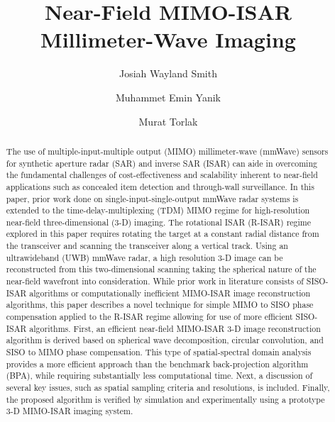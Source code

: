 \documentclass[conference]{IEEEtran}
\begin{document}
	
	\title{Near-Field MIMO-ISAR Millimeter-Wave Imaging}
	
	\author[1]{Josiah Wayland Smith}
	\author[2]{Muhammet Emin Yanik}
	\author[1]{Murat Torlak}
	
	\maketitle
	
	\begin{abstract}
		
		The use of multiple-input-multiple output (MIMO) millimeter-wave (mmWave) sensors for synthetic aperture radar (SAR) and inverse SAR (ISAR) can aide in overcoming the fundamental challenges of cost-effectiveness and scalability inherent to near-field applications such as concealed item detection and through-wall surveillance. In this paper, prior work done on single-input-single-output mmWave radar systems is extended to the time-delay-multiplexing (TDM) MIMO regime for high-resolution near-field three-dimensional (3-D) imaging. The rotational ISAR (R-ISAR) regime explored in this paper requires rotating the target at a constant radial distance from the transceiver and scanning the transceiver along a vertical track. Using an ultrawideband (UWB) mmWave radar, a high resolution 3-D image can be reconstructed from this two-dimensional scanning taking the spherical nature of the near-field wavefront into consideration. While prior work in literature consists of SISO-ISAR algorithms or computationally inefficient MIMO-ISAR image reconstruction algorithms, this paper describes a novel technique for simple MIMO to SISO phase compensation applied to the R-ISAR regime allowing for use of more efficient SISO-ISAR algorithms. First, an efficient near-field MIMO-ISAR 3-D image reconstruction algorithm is derived based on spherical wave decomposition, circular convolution, and SISO to MIMO phase compensation. This type of spatial-spectral domain analysis provides a more efficient approach than the benchmark back-projection algorithm (BPA), while requiring substantially less computational time. Next, a discussion of several key issues, such as spatial sampling criteria and resolutions, is included. Finally, the proposed algorithm is verified by simulation and experimentally using a prototype 3-D MIMO-ISAR imaging system.
		
		\end {abstract}
		
\end{document}
